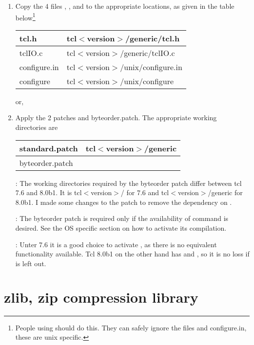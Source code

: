 \documentclass {report}
\begin{document}
\begin {enumerate}
\item	Copy the 4 files , , 
	and  to the appropriate locations, as given
	in the table below\footnote {People using \win{} should do
	this. They can safely ignore the files  and \file
	{configure.in}, these are unix specific.} 

	\begin {tabular} {|l|l|} \hline
	tcl.h		& tcl$<$version$>$/generic/tcl.h	\\ \hline
	tclIO.c		& tcl$<$version$>$/generic/tclIO.c	\\ \hline
	configure.in	& tcl$<$version$>$/unix/configure.in	\\ \hline
	configure	& tcl$<$version$>$/unix/configure	\\ \hline
	\end {tabular}

	or,

\item	Apply the 2 patches  and \file
	{byteorder.patch}. The appropriate working directories are

	\begin {tabular} {|l|l|} \hline
	standard.patch	& tcl$<$version$>$/generic	\\ \hline
	byteorder.patch	& \strong {see below}		\\ \hline
	\end {tabular}

	: The working directories required by the
	byteorder patch differ between tcl 7.6 and 8.0b1. It is
	tcl$<$version$>$/ for 7.6 and tcl$<$version$>$/generic for
	8.0b1. I made some changes to the patch to remove the
	dependency on .

	: The byteorder patch is required only if the
	availability of command  is desired. See the OS
	specific section on how to activate its compilation.

	: Unter 7.6 it is a good choice to
	activate , as there is no equivalent functionality
	available. Tcl 8.0b1 on the other hand has  and
	, so it is no loss if  is left out.

\end   {enumerate}


\chapter {zlib, zip compression library}\label{zlib}
\end{document}
